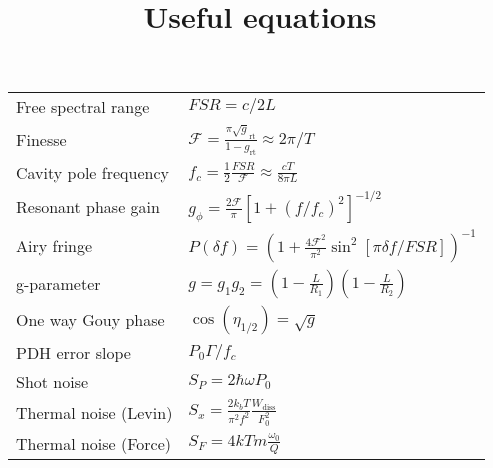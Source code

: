 \documentclass{article}
\begin{document}
\title{Useful equations}
\maketitle

\Large
\begin{tabular}{p{2in}p{4in}}
  Free spectral range & $FSR = c/2 L$\\
  Finesse & $ \mathcal{F} = \frac{\pi \sqrt g_{\mathrm{rt}}}{1-g_{\mathrm{rt}}} \approx 2 \pi/ T$ \\
  Cavity pole frequency & $f_c = \frac{1}{2}\frac{FSR}{\mathcal{F}} \approx \frac{cT}{8\pi L}$\\
  Resonant phase gain & $g_\phi = \frac{2 \mathcal{F}}{\pi}\left[1+\left(f/f_c\right)^2\right]^{-1/2}$\\
  Airy fringe & $P(\delta f) = \left (1 + \frac{4 \mathcal{F}^2}{\pi^2} \sin^2 [
  \pi \delta f / FSR ] \right)^{-1} $ \\
  g-parameter & $g = g_1g_2 = (1 - \frac{L}{R_1})(1 - \frac{L}{R_2})$ \\
  One way Gouy phase & $\cos(\eta_{1/2}) = \sqrt g$ \\
  PDH error slope  & $P_0 \Gamma / f_c$\\
  Shot noise & $S_P = 2\hbar \omega P_0$\\
  Thermal noise (Levin) &  $S_x = \frac{2k_bT}{\pi^2f^2}\frac{W_{\mathrm{diss}}}{F_0^2}$\\
  Thermal noise (Force) & $S_F = 4kTm\frac{\omega_0}{Q}$\\

\end{tabular}
\end{document}
